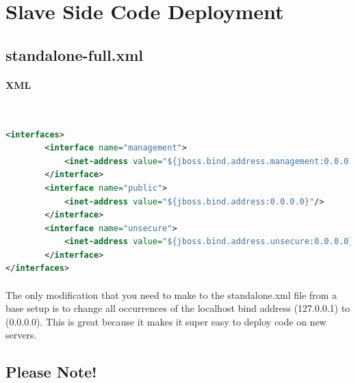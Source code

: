 \documentclass[
10pt, %
letterpaper, %
oneside, %
headinclude,footinclude, %
BCOR5mm, %
]{scrartcl}
\begin{document}
\section{Slave Side Code Deployment}



\subsection{standalone-full.xml}


\paragraph{XML}~
\begin{lstlisting}[language=XML]
<interfaces>
        <interface name="management">
            <inet-address value="${jboss.bind.address.management:0.0.0.0}"/>
        </interface>
        <interface name="public">
            <inet-address value="${jboss.bind.address:0.0.0.0}"/>
        </interface>
        <interface name="unsecure">
            <inet-address value="${jboss.bind.address.unsecure:0.0.0.0}"/>
        </interface>
</interfaces>
\end{lstlisting}
 
\paragraph{} The only modification that you need to make to the standalone.xml file from a base setup is to change all occurrences of the localhost bind address (127.0.0.1) to (0.0.0.0). This is great because it makes it super easy to deploy code on new servers.


\subsection{Please Note!}


\end{document}
